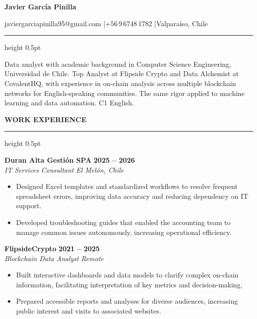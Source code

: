 \documentclass[12pt, a4paper]{article}
\newcommand{\seccion}[1]{%
  \vspace{7pt}%
  {\large\bfseries #1}%
  \vspace{1pt}%
  \hrule height 0.5pt%
  \vspace{2pt}%
}
\newcommand{\trabajo}[4]{%
  \noindent\textbf{#1} \hfill \textbf{#2}\\
  \textit{#3} \hfill \textit{#4}%
  \vspace{1pt}%
}
\begin{document}

{%
  \centering
  {\fontsize{24}{28.8}\selectfont\bfseries Javier García Pinilla}\par
  \vspace{1pt}
  {\fontsize{16}{19}\selectfont javiergarciapinilla95@gmail.com
    \quad|\quad +56\,9\,6748\,1782
    \quad|\quad Valparaíso, Chile}\par
  \vspace{1pt}
  \hrule height 0.5pt
\par}
\vspace{5pt}

\noindent
Data analyst with academic background in Computer Science Engineering,
Universidad de Chile. Top Analyst at Flipside Crypto and Data Alchemist at CovalentHQ,
with experience in on-chain analysis across multiple blockchain networks for
English-speaking communities. The same rigor applied to machine learning and data
automation. C1 English.

\seccion{WORK EXPERIENCE}

\trabajo{Duran Alta Gestión SPA}{2025 -- 2026}{IT Services Consultant}{El Melón, Chile}
\begin{itemize}
  \item Designed Excel templates and standardized workflows to resolve frequent
        spreadsheet errors, improving data accuracy and reducing dependency on IT support.
  \item Developed troubleshooting guides that enabled the accounting team to manage
        common issues autonomously, increasing operational efficiency.
\end{itemize}
\vspace{2pt}

\trabajo{FlipsideCrypto}{2021 -- 2025}{Blockchain Data Analyst}{Remote}
\begin{itemize}
  \item Built interactive dashboards and data models to clarify complex on-chain
        information, facilitating interpretation of key metrics and decision-making.
  \item Prepared accessible reports and analyses for diverse audiences, increasing
        public interest and visits to associated websites.
\end{itemize}
\vspace{2pt}
\end{document}
